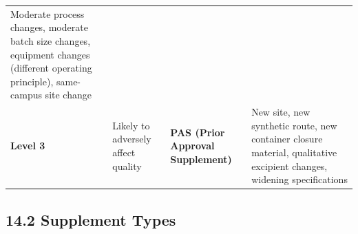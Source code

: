 \documentclass[
  11pt,
  a4paper,
]{report}
\begin{document}
\begin{longtable}[]{@{}llll@{}}
\begin{minipage}[t]{0.25\columnwidth}
Moderate process changes, moderate batch size changes, equipment changes
(different operating principle), same-campus site change\strut
\end{minipage}\tabularnewline
\begin{minipage}[t]{0.17\columnwidth}\raggedright
\textbf{Level 3}\strut
\end{minipage} & \begin{minipage}[t]{0.20\columnwidth}\raggedright
Likely to adversely affect quality\strut
\end{minipage} & \begin{minipage}[t]{0.27\columnwidth}\raggedright
\textbf{PAS (Prior Approval Supplement)}\strut
\end{minipage} & \begin{minipage}[t]{0.25\columnwidth}\raggedright
New site, new synthetic route, new container closure material,
qualitative excipient changes, widening specifications\strut
\end{minipage}\tabularnewline
\bottomrule
\end{longtable}

\hypertarget{supplement-types}{%
\subsection{14.2 Supplement Types}\label{supplement-types}}
\end{document}

